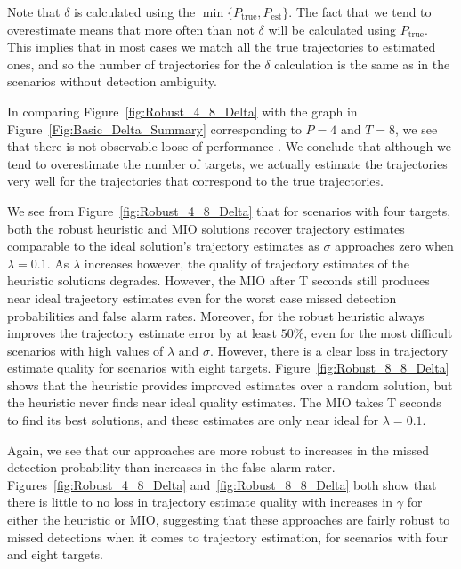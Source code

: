 Note that $\delta$ is calculated using the $\min\{P_{\text{true}},P_{\text{est}}\}$. The fact that we tend to overestimate means that more often than not $\delta$ will be calculated using $P_{\text{true}}$. This implies that in most cases we match all the true trajectories to estimated ones, and so the number of trajectories for the $\delta$ calculation is the same as in the scenarios without detection ambiguity. 

In comparing Figure~\ref{fig:Robust_4_8_Delta}  with the graph in Figure~\ref{Fig:Basic_Delta_Summary} corresponding to $P=4$ and $T=8$, we see that there is not observable loose of performance . We conclude that although we tend to overestimate the number of targets, we actually estimate the trajectories very well for the trajectories that correspond to the true trajectories. 

We see from Figure~\ref{fig:Robust_4_8_Delta} that for scenarios with four targets, both the robust heuristic and MIO solutions recover trajectory estimates comparable to the ideal solution's trajectory estimates as $\sigma$ approaches zero when $\lambda =0.1$. As $\lambda$ increases however, the quality of trajectory estimates of the heuristic solutions degrades. However, the MIO after T seconds still produces near ideal trajectory estimates even for the worst case missed detection probabilities and false alarm rates. Moreover, for the robust heuristic always improves the trajectory estimate error by at least $50\%$, even for the most difficult scenarios with high values of $\lambda$ and $\sigma$. However, there is a clear loss in trajectory estimate quality for scenarios with eight targets. Figure~\ref{fig:Robust_8_8_Delta} shows that the heuristic provides improved estimates over a random solution, but the heuristic never finds near ideal quality estimates. The MIO takes T seconds to find its best solutions, and these estimates are only near ideal for $\lambda=0.1$. 

Again, we see that our approaches are more robust to increases in the missed detection probability than increases in the false alarm rater. Figures~\ref{fig:Robust_4_8_Delta} and~\ref{fig:Robust_8_8_Delta} both show that there is little to no loss in trajectory estimate quality with increases in $\gamma$ for either the heuristic or MIO, suggesting that these approaches are fairly robust to missed detections when it comes to trajectory estimation, for scenarios with four and eight targets. 

